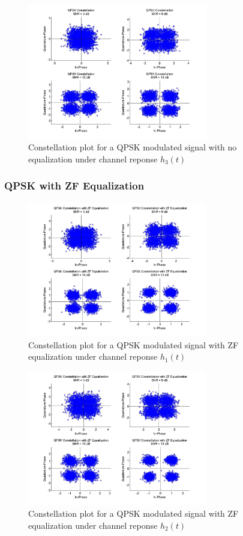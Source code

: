 \documentclass[]{article}
\begin{document}
\begin{figure}[H]
\centering
\includegraphics[width=0.7\textwidth]{qpConst3.jpg}
\caption{Constellation plot for a QPSK modulated signal with no equalization under channel reponse $h_3(t)$}
\end{figure}

\subsubsection{QPSK with ZF Equalization}

\begin{figure}[H]
\centering
\includegraphics[width=0.7\textwidth]{qpConstZF1.jpg}
\caption{Constellation plot for a QPSK modulated signal with ZF equalization under channel reponse $h_1(t)$}
\end{figure}

\begin{figure}[H]
\centering
\includegraphics[width=0.7\textwidth]{qpConstZF2.jpg}
\caption{Constellation plot for a QPSK modulated signal with ZF equalization under channel reponse $h_2(t)$}
\end{figure}
\end{document}
